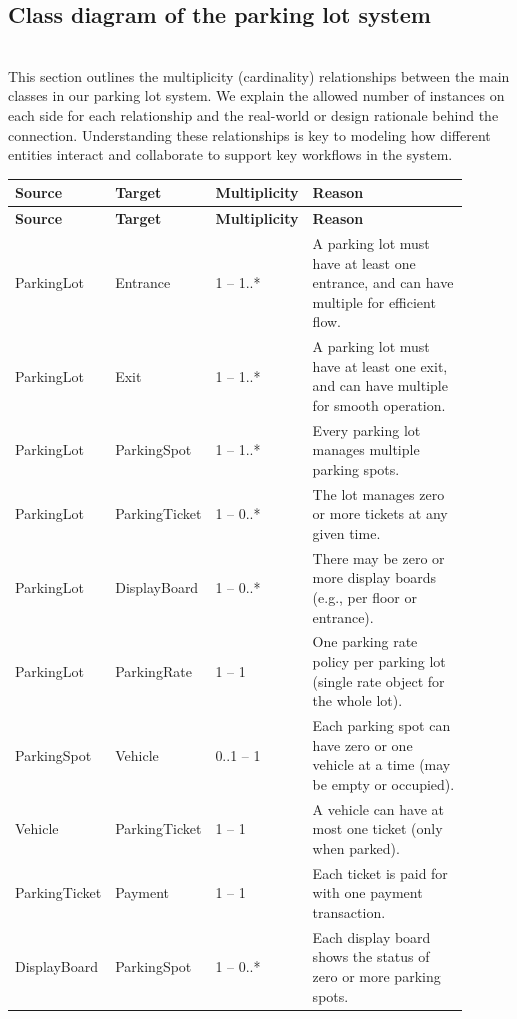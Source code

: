 \subsection{Class diagram of the parking lot system}\label{R5gtrTOfMYj7zxHvFk9-u}
\\
This section outlines the multiplicity (cardinality) relationships between the main classes in our parking lot system. We explain the allowed number of instances on each side for each relationship and the real-world or design rationale behind the connection. Understanding these relationships is key to modeling how different entities interact and collaborate to support key workflows in the system.

\begin{center}
\renewcommand{\arraystretch}{1.4}

\begin{longtable}{|p{0.18\linewidth}|p{0.18\linewidth}|p{0.18\linewidth}|p{0.36\linewidth}|}
\hline
\textbf{Source} & \textbf{Target} & \textbf{Multiplicity} & \textbf{Reason} \\
\hline
\endfirsthead

\hline
\textbf{Source} & \textbf{Target} & \textbf{Multiplicity} & \textbf{Reason} \\
\hline
\endhead

\hline
\endfoot

\hline
\endlastfoot

ParkingLot & Entrance & 1 -- 1..* & A parking lot must have at least one entrance, and can have multiple for efficient flow. \\
\hline
ParkingLot & Exit & 1 -- 1..* & A parking lot must have at least one exit, and can have multiple for smooth operation. \\
\hline
ParkingLot & ParkingSpot & 1 -- 1..* & Every parking lot manages multiple parking spots. \\
\hline
ParkingLot & ParkingTicket & 1 -- 0..* & The lot manages zero or more tickets at any given time. \\
\hline
ParkingLot & DisplayBoard & 1 -- 0..* & There may be zero or more display boards (e.g., per floor or entrance). \\
\hline
ParkingLot & ParkingRate & 1 -- 1 & One parking rate policy per parking lot (single rate object for the whole lot). \\
\hline
ParkingSpot & Vehicle & 0..1 -- 1 & Each parking spot can have zero or one vehicle at a time (may be empty or occupied). \\
\hline
Vehicle & ParkingTicket & 1 -- 1 & A vehicle can have at most one ticket (only when parked). \\
\hline
ParkingTicket & Payment & 1 -- 1 & Each ticket is paid for with one payment transaction. \\
\hline
DisplayBoard & ParkingSpot & 1 -- 0..* & Each display board shows the status of zero or more parking spots. \\
\hline

\end{longtable}
\end{center}

